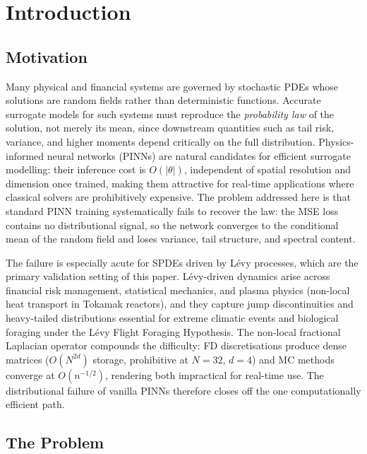 \documentclass[review,12pt]{elsarticle}
\begin{document}
\section{Introduction}
\label{sec:intro}

\subsection{Motivation}
\label{subsec:motivation}

Many physical and financial systems are governed by stochastic PDEs
whose solutions are random fields rather than deterministic functions.
Accurate surrogate models for such systems must reproduce the
\emph{probability law} of the solution, not merely its mean, since
downstream quantities such as tail risk, variance, and higher moments
depend critically on the full distribution.
Physics-informed neural networks (PINNs) are natural candidates for
efficient surrogate modelling: their inference cost is \(O(|\theta|)\),
independent of spatial resolution and dimension once trained, making
them attractive for real-time applications where classical solvers are
prohibitively expensive.
The problem addressed here is that standard PINN training systematically
fails to recover the law: the MSE loss contains no distributional
signal, so the network converges to the conditional mean of the random
field and loses variance, tail structure, and spectral content.

The failure is especially acute for SPDEs driven by L\'evy processes,
which are the primary validation setting of this paper.
L\'evy-driven dynamics arise across financial risk management,
statistical mechanics, and plasma physics (non-local heat transport in
Tokamak reactors), and they capture jump discontinuities and
heavy-tailed distributions essential for extreme climatic events and
biological foraging under the L\'evy Flight Foraging Hypothesis.
The non-local fractional Laplacian operator compounds the difficulty:
FD discretisations produce dense matrices (\(O(N^{2d})\) storage,
prohibitive at \(N=32\), \(d=4\)) and MC methods converge at
\(O(n^{-1/2})\), rendering both impractical for real-time use.
The distributional failure of vanilla PINNs therefore closes off the
one computationally efficient path.

\subsection{The Problem}
\label{subsec:problem}
\end{document}
